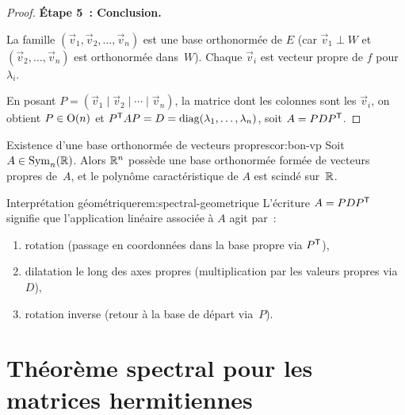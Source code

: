 \begin{proof}
  \medskip
  \noindent\textbf{Étape 5~: Conclusion.}

  La famille $(\vec{v}_1, \vec{v}_2, \ldots, \vec{v}_n)$ est une base
  orthonormée de $E$ (car $\vec{v}_1 \perp W$ et
  $(\vec{v}_2, \ldots, \vec{v}_n)$ est orthonormée dans~$W$). Chaque
  $\vec{v}_i$ est vecteur propre de $f$ pour $\lambda_i$.

  En posant $P = (\vec{v}_1 \mid \vec{v}_2 \mid \cdots \mid \vec{v}_n)$,
  la matrice dont les colonnes sont les $\vec{v}_i$, on obtient
  $P \in \operatorname{O}(n)$ et ${P}^{\mathsf{T}} A P = D = \operatorname{diag}(\lambda_1, \ldots,
  \lambda_n)$, soit $A = P D {P}^{\mathsf{T}}$.
\end{proof}

\begin{corollary}{Existence d'une base orthonormée de vecteurs propres}{cor:bon-vp}
  Soit $A \in \operatorname{Sym}_n({\mathbb{R}})$. Alors ${\mathbb{R}}^n$ possède une base orthonormée
  formée de vecteurs propres de~$A$, et le polynôme caractéristique
  de $A$ est scindé sur~${\mathbb{R}}$.
\end{corollary}

\begin{remark}{Interprétation géométrique}{rem:spectral-geometrique}
  L'écriture $A = P D {P}^{\mathsf{T}}$ signifie que l'application linéaire
  associée à $A$ agit par~:
  \begin{enumerate}[label=(\arabic*)]
    \item rotation (passage en coordonnées dans la base propre via
      ${P}^{\mathsf{T}}$),
    \item dilatation le long des axes propres (multiplication par les
      valeurs propres via~$D$),
    \item rotation inverse (retour à la base de départ via~$P$).
  \end{enumerate}
\end{remark}

\section{Théorème spectral pour les matrices hermitiennes}%
\label{sec:spectral-hermitien}

